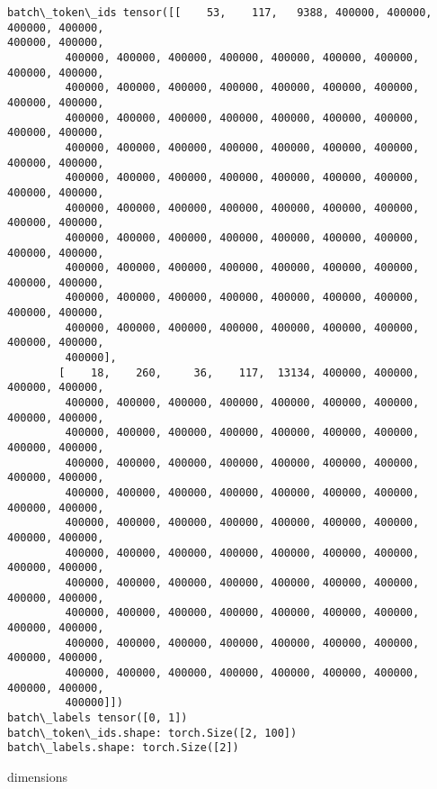 \documentclass[10pt]{article}
\begin{document}
    \begin{Verbatim}[commandchars=\\\{\}]
batch\_token\_ids tensor([[    53,    117,   9388, 400000, 400000, 400000, 400000,
400000, 400000,
         400000, 400000, 400000, 400000, 400000, 400000, 400000, 400000, 400000,
         400000, 400000, 400000, 400000, 400000, 400000, 400000, 400000, 400000,
         400000, 400000, 400000, 400000, 400000, 400000, 400000, 400000, 400000,
         400000, 400000, 400000, 400000, 400000, 400000, 400000, 400000, 400000,
         400000, 400000, 400000, 400000, 400000, 400000, 400000, 400000, 400000,
         400000, 400000, 400000, 400000, 400000, 400000, 400000, 400000, 400000,
         400000, 400000, 400000, 400000, 400000, 400000, 400000, 400000, 400000,
         400000, 400000, 400000, 400000, 400000, 400000, 400000, 400000, 400000,
         400000, 400000, 400000, 400000, 400000, 400000, 400000, 400000, 400000,
         400000, 400000, 400000, 400000, 400000, 400000, 400000, 400000, 400000,
         400000],
        [    18,    260,     36,    117,  13134, 400000, 400000, 400000, 400000,
         400000, 400000, 400000, 400000, 400000, 400000, 400000, 400000, 400000,
         400000, 400000, 400000, 400000, 400000, 400000, 400000, 400000, 400000,
         400000, 400000, 400000, 400000, 400000, 400000, 400000, 400000, 400000,
         400000, 400000, 400000, 400000, 400000, 400000, 400000, 400000, 400000,
         400000, 400000, 400000, 400000, 400000, 400000, 400000, 400000, 400000,
         400000, 400000, 400000, 400000, 400000, 400000, 400000, 400000, 400000,
         400000, 400000, 400000, 400000, 400000, 400000, 400000, 400000, 400000,
         400000, 400000, 400000, 400000, 400000, 400000, 400000, 400000, 400000,
         400000, 400000, 400000, 400000, 400000, 400000, 400000, 400000, 400000,
         400000, 400000, 400000, 400000, 400000, 400000, 400000, 400000, 400000,
         400000]])
batch\_labels tensor([0, 1])
batch\_token\_ids.shape: torch.Size([2, 100])
batch\_labels.shape: torch.Size([2])
    \end{Verbatim}

    dimensions
\end{document}
